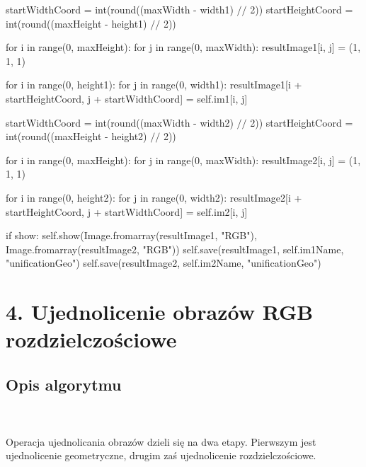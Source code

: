 \documentclass[final,a4paper,openany,12pt]{mwbk}
\begin{document}
startWidthCoord = int(round((maxWidth - width1) $//$ 2)) \newline
\indent startHeightCoord = int(round((maxHeight - height1) $//$ 2)) \newline

for i in range(0, maxHeight): \newline
\indent for j in range(0, maxWidth): \newline
\indent resultImage1[i, j] = (1, 1, 1) \newline

for i in range(0, height1): \newline
\indent for j in range(0, width1): \newline
\indent resultImage1[i + startHeightCoord, j + startWidthCoord] = self.im1[i, j] \newline

startWidthCoord = int(round((maxWidth - width2) $//$ 2)) \newline
\indent startHeightCoord = int(round((maxHeight - height2) $//$ 2)) \newline

for i in range(0, maxHeight): \newline
\indent for j in range(0, maxWidth): \newline
\indent resultImage2[i, j] = (1, 1, 1) \newline

for i in range(0, height2): \newline
\indent for j in range(0, width2): \newline
\indent resultImage2[i + startHeightCoord, j + startWidthCoord] = self.im2[i, j] \newline

if show: \newline
\indent self.show(Image.fromarray(resultImage1, "RGB"), Image.fromarray(resultImage2, "RGB")) \newline
\indent self.save(resultImage1, self.im1Name, "unificationGeo") \newline
\indent self.save(resultImage2, self.im2Name, "unificationGeo") \newline
\newpage





\section*{4. Ujednolicenie obrazów RGB rozdzielczościowe}
\subsection*{Opis algorytmu}
\hfill
\\\\
\indent 
Operacja ujednolicania obrazów dzieli się na dwa etapy. Pierwszym jest ujednolicenie geometryczne, drugim zaś ujednolicenie rozdzielczościowe.
\end{document}
